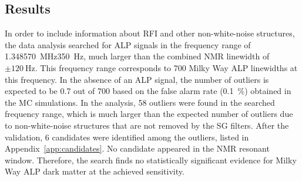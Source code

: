 


\subsection{Results}\label{sec:results:MWALP20221223:results}

In order to include information about RFI and other non-white-noise structures, the data analysis searched for ALP signals in the frequency range of \SI{1.348570}{\MHz}\pm\SI{350}{\Hz}, much larger than the combined NMR linewidth of $\pm\SI{120}{\Hz}$.
This frequency range corresponds to \SI{700}{} Milky Way ALP linewidths at this frequency.
In the absence of an ALP signal, the number of outliers is expected to be \SI{.7}{} out of \SI{700}{} based on the false alarm rate (\SI{.1}{\percent}) obtained in the MC simulations.
In the analysis, \SI{58}{} outliers were found in the searched frequency range, which is much larger than the expected number of outliers due to non-white-noise structures that are not removed by the SG filters.
After the validation, \SI{6}{} candidates were identified among the outliers, listed in Appendix~\ref{app:candidates}.
No candidate appeared in the NMR resonant window.
Therefore, the search finds no statistically significant evidence for Milky Way ALP dark matter at the achieved sensitivity.


